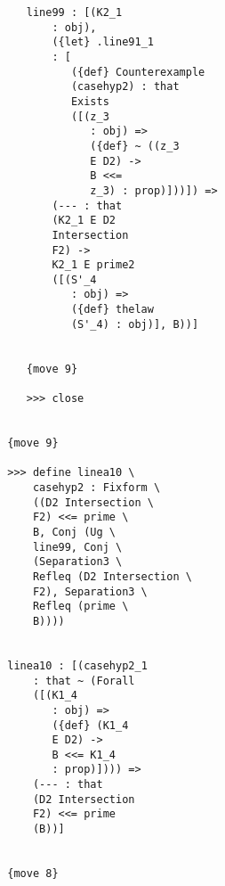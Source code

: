 \documentclass[12pt]{article}
\begin{document}
\begin{verbatim}
                              line99 : [(K2_1 
                                  : obj), 
                                  ({let} .line91_1 
                                  : [
                                     ({def} Counterexample 
                                     (casehyp2) : that 
                                     Exists 
                                     ([(z_3 
                                        : obj) => 
                                        ({def} ~ ((z_3 
                                        E D2) -> 
                                        B <<= 
                                        z_3) : prop)]))]) => 
                                  (--- : that 
                                  (K2_1 E D2 
                                  Intersection 
                                  F2) -> 
                                  K2_1 E prime2 
                                  ([(S'_4 
                                     : obj) => 
                                     ({def} thelaw 
                                     (S'_4) : obj)], B))]


                              {move 9}

                              >>> close


                           {move 9}

                           >>> define linea10 \
                               casehyp2 : Fixform \
                               ((D2 Intersection \
                               F2) <<= prime \
                               B, Conj (Ug \
                               line99, Conj \
                               (Separation3 \
                               Refleq (D2 Intersection \
                               F2), Separation3 \
                               Refleq (prime \
                               B))))


                           linea10 : [(casehyp2_1 
                               : that ~ (Forall 
                               ([(K1_4 
                                  : obj) => 
                                  ({def} (K1_4 
                                  E D2) -> 
                                  B <<= K1_4 
                                  : prop)]))) => 
                               (--- : that 
                               (D2 Intersection 
                               F2) <<= prime 
                               (B))]


                           {move 8}


\end{verbatim}
\end{document}
